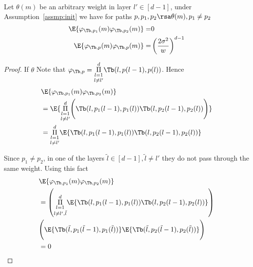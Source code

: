 \begin{lemma}\label{lm:pathdot}
Let $\theta(m)$ be an arbitrary weight in layer $l'\in [d-1]$, under Assumption~\ref{assmp:init} we have for paths $p,p_1,p_2\rsa\theta(m), p_1\neq p_2$
\begin{align*}
\E{\varphi_{\Tb,p_1}(m)\varphi_{\Tb,p_2}(m)}= &0\\
\E{\varphi_{\Tb,p}(m)\varphi_{\Tb,p}(m)}= &\left(\frac{2\sigma^2}{w}\right)^{d-1}
\end{align*}
\end{lemma}
\begin{proof}
If $\theta$
Note that $\varphi_{\Tb,p}=\underset{l\neq l'}{\underset{l=1}{\overset{d}{\Pi}}} \Tb(l,p(l-1),p(l))$. Hence
\begin{align*}
&\E{\varphi_{\Tb,p_1}(m)\varphi_{\Tb,p_2}(m)}\\
&=\E{\underset{l\neq l'}{\underset{l=1}{\overset{d}{\Pi}}} \Bigg(\Tb(l,p_1(l-1),p_1(l))\Tb(l,p_2(l-1),p_2(l)) \Bigg)}\\
&=\underset{l\neq l'}{\underset{l=1}{\overset{d}{\Pi}}}\E{\Tb(l,p_1(l-1),p_1(l))\Tb(l,p_2(l-1),p_2(l))}
\end{align*}

Since $p_1\neq p_2$, in one of the layers $\tilde{l}\in[d-1],\tilde{l}\neq l'$ they do not pass through the same weight. Using this fact
\begin{align*}
&\E{\varphi_{\Tb,p_1}(m)\varphi_{\Tb,p_2}(m)}\\
&=\left(\underset{l\neq l',\tilde{l}}{\underset{l=1}{\overset{d}{\Pi}}}\E{\Tb(l,p_1(l-1),p_1(l))\Tb(l,p_2(l-1),p_2(l))}\right)\\
&\Bigg(\E{\Tb(\tilde{l},p_1(\tilde{l}-1),p_1(\tilde{l}))}\E{\Tb(\tilde{l},p_2(\tilde{l}-1),p_2(\tilde{l}))}\Bigg)\\
&=0
\end{align*}
\end{proof}


